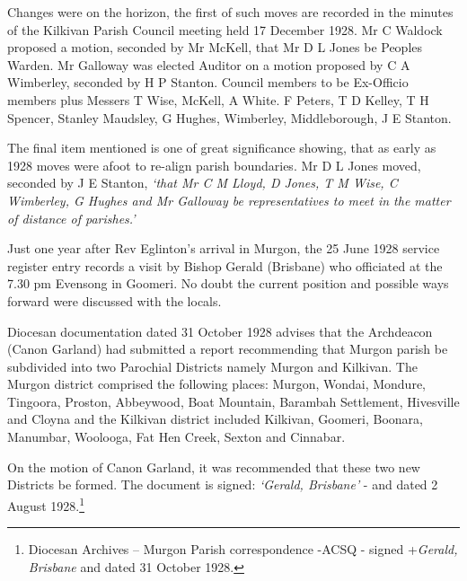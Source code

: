 Changes were on the horizon, the first of such moves are recorded in the minutes of the Kilkivan Parish Council meeting held 17 December 1928. Mr C Waldock proposed a motion, seconded by Mr McKell, that Mr D L Jones be Peoples Warden. Mr Galloway was elected Auditor on a motion proposed by C A Wimberley, seconded by H P Stanton. Council members to be Ex-Officio members plus Messers T Wise, McKell, A White. F Peters, T D Kelley, T H Spencer, Stanley Maudsley, G Hughes, Wimberley, Middleborough, J E Stanton.



The final item mentioned is one of great significance showing, that as early as 1928 moves were afoot to re-align parish boundaries. Mr D L Jones moved, seconded by J E Stanton, \emph{`that Mr C M Lloyd, D Jones, T M Wise, C Wimberley, G Hughes and Mr Galloway be representatives to meet in the matter of distance of parishes.'}



Just one year after Rev Eglinton's arrival in Murgon, the 25 June 1928 service register entry records a visit by Bishop Gerald (Brisbane) who officiated at the 7.30 pm Evensong in Goomeri. No doubt the current position and possible ways forward were discussed with the locals.



Diocesan documentation dated 31 October 1928 advises that the Archdeacon (Canon Garland) had submitted a report recommending that Murgon parish be subdivided into two Parochial Districts namely Murgon and Kilkivan. The Murgon district comprised the following places: Murgon, Wondai, Mondure, Tingoora, Proston, Abbeywood, Boat Mountain, Barambah Settlement, Hivesville and Cloyna and the Kilkivan district included Kilkivan, Goomeri, Boonara, Manumbar, Woolooga, Fat Hen Creek, Sexton and Cinnabar.



On the motion of Canon Garland, it was recommended that these two new Districts be formed. The document is signed: \emph{`Gerald, Brisbane'} - and dated 2 August 1928.\footnote{Diocesan Archives -- Murgon Parish correspondence -ACSQ - signed +\emph{Gerald, Brisbane} and dated 31 October 1928.}



